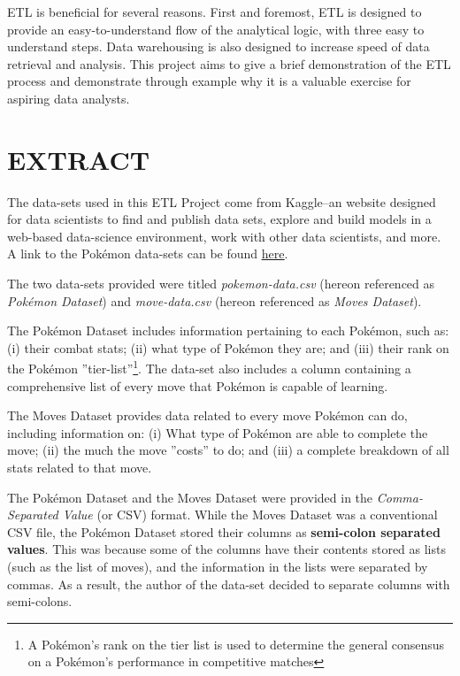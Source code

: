 \documentclass[10pt]{article}
\begin{document}
ETL is beneficial for several reasons. First and foremost, ETL is designed to provide an easy-to-understand flow of the analytical logic, with three easy to understand steps. Data warehousing is also designed to increase speed of data retrieval and analysis. This project aims to give a brief demonstration of the ETL process and demonstrate through example why it is a valuable exercise for aspiring data analysts.


\section{EXTRACT}
The data-sets used in this ETL Project come from Kaggle--an website designed for data scientists to find and publish data sets, explore and build models in a web-based data-science environment, work with other data scientists, and more. A link to the Pokémon data-sets can be found \underline{\href{https://www.kaggle.com/n2cholas/competitive-pokemon-dataset}{here}}.

The two data-sets provided were titled \textit{pokemon-data.csv} (hereon referenced as \textit{Pokémon Dataset}) and \textit{move-data.csv} (hereon referenced as \textit{Moves Dataset}). 

The Pokémon Dataset includes information pertaining to each Pokémon, such as: (i) their combat stats; (ii) what type of Pokémon they are; and (iii) their rank on the Pokémon ''tier-list''\footnote{A Pokémon's rank on the tier list is used to determine the general consensus on a Pokémon's performance in competitive matches}. The data-set also includes a column containing a comprehensive list of every move that Pokémon is capable of learning. 

The Moves Dataset provides data related to every move Pokémon can do, including information on: (i) What type of Pokémon are able to complete the move; (ii) the much the move ''costs'' to do; and (iii) a complete breakdown of all stats related to that move.

The Pokémon Dataset and the Moves Dataset were provided in the \textit{Comma-Separated Value} (or CSV) format. While the Moves Dataset was a conventional CSV file, the Pokémon Dataset stored their columns as \textbf{semi-colon separated values}. This was because some of the columns have their contents stored as lists (such as the list of moves), and the information in the lists were separated by commas. As a result, the author of the data-set decided to separate columns with semi-colons.
\end{document}

